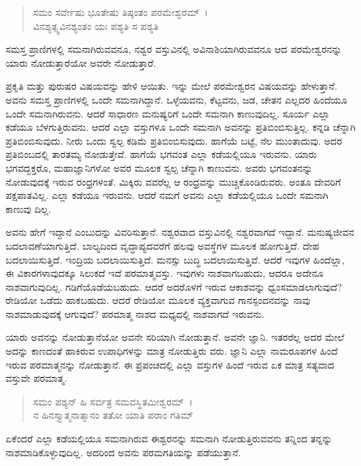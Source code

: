 \begin{verse}
ಸಮಂ ಸರ್ವೇಷು ಭೂತೇಷು ತಿಷ್ಠಂತಂ ಪರಮೇಶ್ವರಮ್~।\\ವಿನಶ್ಯತ್ಸ್ವವಿನಶ್ಯಂತಂ ಯಃ ಪಶ್ಯತಿ ಸ ಪಶ್ಯತಿ 
\end{verse}

{\small ಸಮಸ್ತ ಪ್ರಾಣಿಗಳಲ್ಲಿ ಸಮನಾಗಿರುವವನೂ, ನಶ್ವರ ವಸ್ತುವಿನಲ್ಲಿ ಅವಿನಾಶಿಯಾಗಿರುವವನೂ ಆದ ಪರಮೇಶ್ವರನನ್ನು ಯಾರು ನೋಡುತ್ತಾರೆಯೋ ಅವರೇ ನೋಡುತ್ತಾರೆ.}

ಪ್ರಕೃತಿ ಮತ್ತು ಪುರುಷರ ವಿಷಯವನ್ನು ಹೇಳಿ ಆಯಿತು. ಇನ್ನು ಮೇಲೆ ಪರಮೇಶ್ವರನ ವಿಷಯವನ್ನು ಹೇಳುತ್ತಾನೆ. ಅವನು ಸಮಸ್ತ ಪ್ರಾಣಿಗಳಲ್ಲಿ ಒಂದೇ ಸಮನಾಗಿದ್ದಾನೆ. ಒಳ್ಳೆಯವನು, ಕೆಟ್ಟವನು, ಜಡ, ಚೇತನ ಎಲ್ಲದರ ಹಿಂದೆಯೂ ಒಂದೇ ಸಮನಾಗಿರುವನು. ಆದರೆ ಸಾಧಾರಣ ಮನುಷ್ಯರಿಗೆ ಒಂದೇ ಸಮನಾಗಿ ಕಾಣುವುದಿಲ್ಲ. ಸೂರ್ಯ ಎಲ್ಲಾ ಕಡೆಯೂ ಬೆಳಗುತ್ತಿರುವನು. ಆದರೆ ಎಲ್ಲಾ ವಸ್ತುಗಳೂ ಒಂದೇ ಸಮನಾಗಿ ಅವನನ್ನು ಪ್ರತಿಬಿಂಬಿಸುತ್ತಿಲ್ಲ. ಕನ್ನಡಿ ಚೆನ್ನಾಗಿ ಪ್ರತಿಬಿಂಬಿಸುವುದು. ನೀರು ಒಂದು ಸ್ವಲ್ಪ ಕಡಿಮೆ ಪ್ರತಿಬಿಂಬಿಸುವುದು. ಹಾಗೆಯೆ ಬಟ್ಟೆ, ನೆಲ ಮುಂತಾದುವು. ಅದರ ಪ್ರತಿಬಿಂಬದಲ್ಲಿ ತಾರತಮ್ಯ ನೋಡುತ್ತೇವೆ. ಹಾಗೆಯೆ ಭಗವಂತ ಎಲ್ಲಾ ಕಡೆಯಲ್ಲಿಯೂ ಇರುವನು. ಯಾರು ಭಗವದ್ಭಕ್ತರೊ, ಮಹಾಜ್ಞಾನಿಗಳೋ ಅವರ ಮೂಲಕ ಸ್ವಲ್ಪ ಚೆನ್ನಾಗಿ ಕಾಣುವನು. ಅವರು ಭಗವಂತನನ್ನು ನೋಡುವುದಕ್ಕೆ ಇರುವ ರಂಧ್ರಗಳಂತೆ. ಮಿಕ್ಕಿರು ವವರೆಲ್ಲ ಆ ರಂಧ್ರವನ್ನು ಮುಚ್ಚಿಕೊಂಡಿರುವರು. ಅಂತೂ ದೇವರಿಗೆ ಪಕ್ಷಪಾತವಿಲ್ಲ. ಎಲ್ಲಾ ಕಡೆಯೂ ಇರುವನು. ಆದರೆ ನಮಗೆ ಅವನು ಎಲ್ಲಾ ಕಡೆಯಲ್ಲಿಯೂ ಒಂದೇ ಸಮನಾಗಿ ಕಾಣುವು ದಿಲ್ಲ.

ಅವನು ಹೇಗೆ ಇದ್ದಾನೆ ಎಂಬುದನ್ನು ವಿವರಿಸುತ್ತಾನೆ. ನಶ್ವರವಾದ ವಸ್ತುವಿನಲ್ಲಿ ನಶ್ವರವಾಗದೆ ಇದ್ದಾನೆ. ಮನುಷ್ಯಜೀವನ ಬದಲಾವಣೆಯಾಗುತ್ತಿದೆ. ಬಾಲ್ಯದಿಂದ ವೃದ್ಧಾಪ್ಯದವರೆಗೆ ಹಲವು ಅವಸ್ಥೆಗಳ ಮೂಲಕ ಹೋಗುತ್ತಿದೆ. ದೇಹ ಬದಲಾಯಿಸುತ್ತಿದೆ. ಇಂದ್ರಿಯ ಬದಲಾಯಿಸುತ್ತಿದೆ. ಮನಸ್ಸು ಬುದ್ಧಿ ಬದಲಾಯಿಸುತ್ತಿವೆ. ಆದರೆ ಇವುಗಳ ಹಿಂದೆಲ್ಲಾ, ಈ ವಿಕಾರಗಳಾವುದಕ್ಕೂ ಸಿಲುಕದೆ ಇದೆ ಪರಮಾತ್ಮವಸ್ತು. ಇವುಗಳು ನಾಶವಾಗಬಹುದು, ಆದರೂ ಅದೇನೂ ನಾಶವಾಗುವುದಿಲ್ಲ. ಗಡಿಗೆಯೊಡೆಯಬಹುದು. ಆದರೆ ಅದರೊಳಗೆ ಇರುವ ಆಕಾಶವನ್ನು ಧ್ವಂಸಮಾಡಲಾಗುವುದೆ? ರೇಡಿಯೋ ಒಡೆದು ಹಾಕಬಹುದು. ಆದರೆ ರೇಡಿಯೋ ಮೂಲಕ ವ್ಯಕ್ತವಾಗುವ ಗಾನಸ್ಪಂದನವನ್ನು ನಾವು ನಾಶಮಾಡುವುದಕ್ಕೆ ಆಗುವುದೆ? ಪರಮಾತ್ಮ ನಾಶದ ಮಧ್ಯದಲ್ಲಿ ನಾಶವಾಗದೆ ಇರುವನು.

ಯಾರು ಅವನನ್ನು ನೋಡುತ್ತಾನೆಯೋ ಅವನೇ ಸರಿಯಾಗಿ ನೋಡುತ್ತಾನೆ. ಅವನೇ ಜ್ಞಾನಿ. ಇತರರೆಲ್ಲ ಅದರ ಮೇಲೆ ಅದನ್ನು ಕಾಣದಂತೆ ಹಾಕಿರುವ ಉಪಾಧಿಗಳನ್ನು ಮಾತ್ರ ನೋಡುತ್ತಿರು ವರು. ಜ್ಞಾನಿ ಎಲ್ಲಾ ನಾಮರೂಪಗಳ ಹಿಂದೆ ಇರುವ ಪರಮಾತ್ಮನನ್ನು ನೋಡುತ್ತಾನೆ. ಈ ಪ್ರಪಂಚದಲ್ಲಿ ಎಲ್ಲಾ ವಸ್ತುಗಳ ಹಿಂದೆ ಇರುವ ಏಕ ಮಾತ್ರ ಸತ್ಯವಾದ ವಸ್ತುವೇ ಪರಮಾತ್ಮ.

\begin{verse}
ಸಮಂ ಪಶ್ಯನ್ ಹಿ ಸರ್ವತ್ರ ಸಮವಸ್ಥಿತಮೀಶ್ವರಮ್~।\\ನ ಹಿನಸ್ತ್ಯಾತ್ಮನಾತ್ಮಾನಂ ತತೋ ಯಾತಿ ಪರಾಂ ಗತಿಮ್ 
\end{verse}

{\small ಏಕೆಂದರೆ ಎಲ್ಲಾ ಕಡೆಯಲ್ಲಿಯೂ ಸಮನಾಗಿರುವ ಈಶ್ವರನನ್ನು ಸಮನಾಗಿ ನೋಡುತ್ತಿರುವವನು ತನ್ನಿಂದ ತನ್ನನ್ನು ನಾಶಮಾಡಿಕೊಳ್ಳುವುದಿಲ್ಲ. ಅದರಿಂದ ಅವನು ಪರಮಗತಿಯನ್ನು ಪಡೆಯುತ್ತಾನೆ.}

